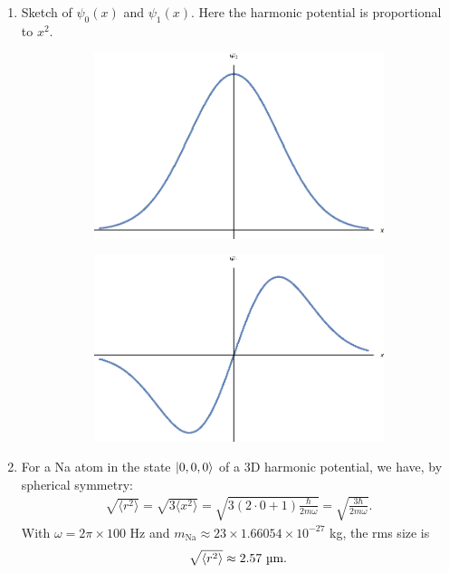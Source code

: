 \documentclass{article}
\theoremstyle{definition}
\newcommand{\f}[2]{\frac{#1}{#2}}
\begin{document}
\begin{enumerate}[label=\alph*)]
	\item Sketch of $\psi_0(x)$ and $\psi_1(x)$. Here the harmonic potential is proportional to $x^2$. 
	
	
	\begin{figure}[!htb]
		\begin{subfigure}{0.5\textwidth}
			\centering
			\includegraphics[width=\textwidth]{n_0.eps}
		\end{subfigure}
		\begin{subfigure}{0.5\textwidth}
			\centering
			\includegraphics[width=\textwidth]{n_1.eps}
		\end{subfigure}
	\end{figure}
	
	
	
	\item For a Na atom in the state $\ket{0,0,0}$ of a 3D harmonic potential, we have, by spherical symmetry:
	\begin{align*}
	\sqrt{\langle r^2\rangle} = \sqrt{3\langle x^2 \rangle } = \sqrt{3(2\cdot 0+1)\f{\hbar}{2m\omega}} = \sqrt{\f{3\hbar}{2m\omega}}.
	\end{align*}
	With $\omega = 2\pi \times 100 $ Hz and $m_\text{Na} \approx 23 \times 1.66054\times 10^{-27}$ kg, the rms size is
	\begin{align*}
	\sqrt{\langle r^2\rangle} \approx 2.57 \text{ \textmu m}.
	\end{align*}
	

\end{enumerate}
\end{document}
